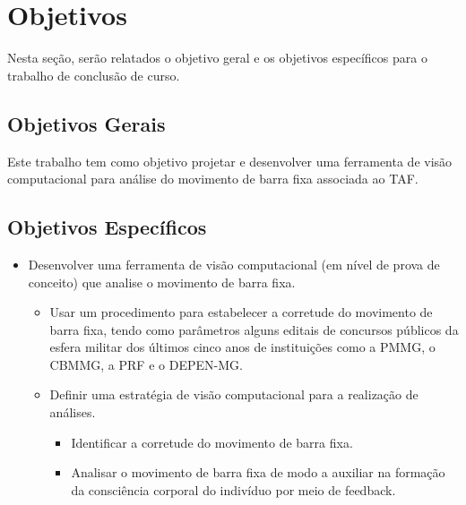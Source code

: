\section{Objetivos}
Nesta seção, serão relatados o objetivo geral e os objetivos específicos para o trabalho de conclusão de curso.

\subsection{Objetivos Gerais}	
Este trabalho tem como objetivo projetar e desenvolver uma ferramenta de visão computacional para análise do movimento de barra fixa associada ao \ac{TAF}.

\subsection{Objetivos Específicos}	
\begin{itemize}

    \item Desenvolver uma ferramenta de visão computacional (em nível de prova de conceito) que analise o movimento de barra fixa.
    \begin{itemize}
        \item Usar um procedimento para estabelecer a corretude do movimento de barra fixa, tendo como parâmetros alguns editais de concursos públicos da esfera militar dos últimos cinco anos de instituições como a \ac{PMMG}, o \ac{CBMMG}, a \ac{PRF} e o \ac{DEPEN-MG}.
        \item Definir uma estratégia de visão computacional para a realização de análises.
        \begin{itemize}
            \item Identificar a corretude do movimento de barra fixa.
            \item Analisar o movimento de barra fixa de modo a auxiliar na formação da consciência corporal do indivíduo por meio de feedback.
        \end{itemize}
    \end{itemize}    
\end{itemize}


 
 